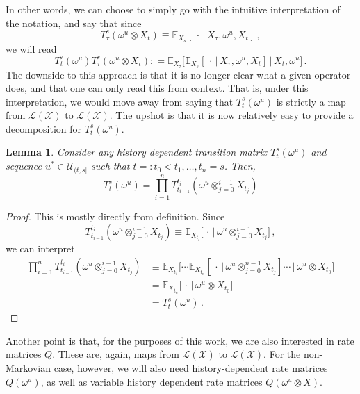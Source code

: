 \documentclass[a4paper,reqno]{amsart}
\newtheorem{lemma}[theorem]{Lemma}
\newcommand{\states}{\mathcal{X}}
\newcommand{\gambles}{\mathcal{L}}
\newcommand{\gamblesX}{\gambles(\states)}
\newcommand{\coloneqq}{:\!=}
\begin{document}
In other words, we can choose to simply go with the intuitive interpretation of the notation, and say that since
\begin{equation*}
T_\tau^s(\omega^u\otimes X_t) \equiv \mathbb{E}_{X_s}[\,\cdot\,\vert\,X_\tau,\omega^u,X_t]\,,
\end{equation*}
we will read
\begin{equation*}
T_t^\tau(\omega^u)T_\tau^s(\omega^u\otimes X_t) \coloneqq \mathbb{E}_{X_\tau}\bigl[ \mathbb{E}_{X_s}[\,\cdot\,\vert\, X_\tau,\omega^u,X_t] \,\big\vert\,X_t,\omega^u\bigr]\,.
\end{equation*}
The downside to this approach is that it is no longer clear what a given operator does, and that one can only read this from context. That is, under this interpretation, we would move away from saying that $T_t^s(\omega^u)$ is strictly a map from $\gamblesX$ to $\gamblesX$.
The upshot is that it is now relatively easy to provide a decomposition for $T_t^s(\omega^u)$.
\begin{lemma}
Consider any history dependent transition matrix $T_t^s(\omega^u)$ and sequence $u^*\in\mathcal{U}_{(t,s]}$ such that $t=\!:t_0<t_1,\ldots,t_n=s$. Then,
\begin{equation*}
T_t^s(\omega^u) = \prod_{i=1}^{n} T_{t_{i-1}}^{t_i}(\omega^u\otimes_{j=0}^{i-1}X_{t_j})
\end{equation*}
\end{lemma}
\begin{proof}
This is mostly directly from definition. Since
\begin{equation*}
T_{t_{i-1}}^{t_i}(\omega^u\otimes_{j=0}^{i-1}X_{t_j}) \equiv \mathbb{E}_{X_{t_i}}\bigl[\,\cdot\,\vert\,\omega^u\otimes_{j=0}^{i-1}X_{t_j}\bigr]\,,
\end{equation*}
we can interpret
\begin{align*}
\prod_{i=1}^{n} T_{t_{i-1}}^{t_i}(\omega^u\otimes_{j=0}^{i-1}X_{t_j}) &\equiv \mathbb{E}_{X_{t_1}}\bigl[\cdots\mathbb{E}_{X_{t_n}}[\,\cdot\,\vert\,\omega^u\otimes_{j=0}^{n-1}X_{t_j}]\cdots\,\vert\,\omega^u\otimes X_{t_0}\bigr] \\
 &= \mathbb{E}_{X_{t_n}}\bigl[\,\cdot\,\vert\,\omega^u\otimes X_{t_0}\bigr] \\
 &= T_t^s(\omega^u)\,.
\end{align*}
\end{proof}

Another point is that, for the purposes of this work, we are also interested in rate matrices $Q$. These are, again, maps from $\gamblesX$ to $\gamblesX$. For the non-Markovian case, however, we will also need history-dependent rate matrices $Q(\omega^u)$, as well as variable history dependent rate matrices $Q(\omega^u\otimes X)$.
\end{document}
